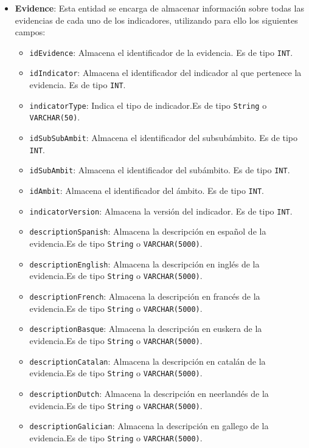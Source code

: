 \begin{itemize}
    \item \textbf{Evidence}: Esta entidad se encarga de almacenar información sobre todas las evidencias de cada uno de los indicadores, utilizando para ello los siguientes campos:
        \begin{itemize}
        \item \texttt{idEvidence}: Almacena el identificador de la evidencia. Es de tipo \texttt{INT}.
        \item \texttt{idIndicator}: Almacena el identificador del indicador al que pertenece la evidencia. Es de tipo \texttt{INT}.
        \item \texttt{indicatorType}: Indica el tipo de indicador.Es de tipo \texttt{String} o \texttt{VARCHAR(50)}.
        \item \texttt{idSubSubAmbit}: Almacena el identificador del subsubámbito. Es de tipo \texttt{INT}.
        \item \texttt{idSubAmbit}: Almacena el identificador del subámbito. Es de tipo \texttt{INT}.
        \item \texttt{idAmbit}: Almacena el identificador del ámbito. Es de tipo \texttt{INT}.
        \item \texttt{indicatorVersion}: Almacena la versión del indicador. Es de tipo \texttt{INT}.
        \item \texttt{descriptionSpanish}: Almacena la descripción en español de la evidencia.Es de tipo \texttt{String} o \texttt{VARCHAR(5000)}.
        \item \texttt{descriptionEnglish}: Almacena la descripción en inglés de la evidencia.Es de tipo \texttt{String} o \texttt{VARCHAR(5000)}.
        \item \texttt{descriptionFrench}: Almacena la descripción en francés de la evidencia.Es de tipo \texttt{String} o \texttt{VARCHAR(5000)}.
        \item \texttt{descriptionBasque}: Almacena la descripción en euskera de la evidencia.Es de tipo \texttt{String} o \texttt{VARCHAR(5000)}.
        \item \texttt{descriptionCatalan}: Almacena la descripción en catalán de la evidencia.Es de tipo \texttt{String} o \texttt{VARCHAR(5000)}.
        \item \texttt{descriptionDutch}: Almacena la descripción en neerlandés de la evidencia.Es de tipo \texttt{String} o \texttt{VARCHAR(5000)}.
        \item \texttt{descriptionGalician}: Almacena la descripción en gallego de la evidencia.Es de tipo \texttt{String} o \texttt{VARCHAR(5000)}.

\end{itemize}
\end{itemize}
